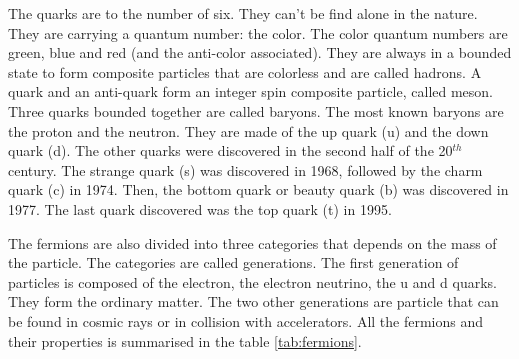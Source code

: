    The quarks are to the number of six.
    They can't be find alone in the nature.
    They are carrying a quantum number: the color.
    The color quantum numbers are green, blue and red (and the anti-color associated).
    They are always in a bounded state to form composite particles that are colorless and are called hadrons.
    A quark and an anti-quark form an integer spin composite particle, called meson.
    Three quarks bounded together are called baryons. The most known baryons are the proton and the neutron.
    They are made of the up quark (u) and the down quark (d).
    The other quarks were discovered in the second half of the 20$^{th}$ century.
    The strange quark (s) was discovered in 1968, followed by the charm quark (c) in 1974.
    Then, the bottom quark or beauty quark (b) was discovered in 1977.
    The last quark discovered was the top quark (t) in 1995.  

    The fermions are also divided into three categories that depends on the mass of the particle.
    The categories are called generations.
    The first generation of particles is composed of the electron, the electron neutrino, the u and d quarks. 
    They form the ordinary matter.
    The two other generations are particle that can be found in cosmic rays or in collision with accelerators.
    All the fermions and their properties is summarised in the table \ref{tab:fermions}.

